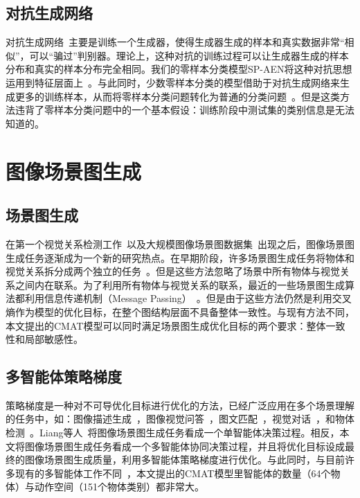 \subsection{对抗生成网络}
对抗生成网络~\cite{goodfellow2014generative}主要是训练一个生成器，使得生成器生成的样本和真实数据非常“相似”，可以“骗过”判别器。理论上，这种对抗的训练过程可以让生成器生成的样本分布和真实的样本分布完全相同。我们的零样本分类模型SP-AEN将这种对抗思想运用到特征层面上~\cite{odena2017conditional,tzeng2017adversarial,makhzani2015adversarial,shrivastava2017learning}。与此同时，少数零样本分类的模型借助于对抗生成网络来生成更多的训练样本，从而将零样本分类问题转化为普通的分类问题~\cite{mishra2018generative}。但是这类方法违背了零样本分类问题中的一个基本假设：训练阶段中测试集的类别信息是无法知道的。


\section{图像场景图生成}

\subsection{场景图生成}
在第一个视觉关系检测工作~\cite{lu2016visual}以及大规模图像场景图数据集~\cite{krishna2017visual}出现之后，图像场景图生成任务逐渐成为一个新的研究热点。在早期阶段，许多场景图生成任务将物体和视觉关系拆分成两个独立的任务~\cite{lu2016visual,zhang2017visual,zhuang2017towards,zhu2018deep,zhang2017relationship}。但是这些方法忽略了场景中所有物体与视觉关系之间内在联系。为了利用所有物体与视觉关系的联系，最近的一些场景图生成算法都利用信息传递机制（Message Passing）~\cite{xu2017scene,dai2017detecting,li2017scene,li2018factorizable,yin2018zoom,jae2018tensorize,yang2018graph,tang2019learning,gu2019scene,qi2019attentive,wang2019exploring}。但是由于这些方法仍然是利用交叉熵作为模型的优化目标，在整个图结构层面不具备整体一致性。与现有方法不同，本文提出的CMAT模型可以同时满足场景图生成优化目标的两个要求：整体一致性和局部敏感性。


\subsection{多智能体策略梯度}

策略梯度是一种对不可导优化目标进行优化的方法，已经广泛应用在多个场景理解的任务中，如：图像描述生成~\cite{ranzato2016sequence,ren2017deep,liu2017improved,rennie2017self,zhang2017actor,liu2018context}，图像视觉问答~\cite{hu2017learning,johnson2017inferring}，图文匹配~\cite{chen2017query,yu2017joint}，视觉对话~\cite{das2017learning}，和物体检测~\cite{caicedo2015active,mathe2016reinforcement,jie2016tree}。Liang等人~\cite{liang2017deep}将图像场景图生成任务看成一个单智能体决策过程。相反，本文将图像场景图生成任务看成一个多智能体协同决策过程，并且将优化目标设成最终的图像场景图生成质量，利用多智能体策略梯度进行优化。与此同时，与目前许多现有的多智能体工作不同~\cite{foerster2016learning,omidshafiei2017deep}，本文提出的CMAT模型里智能体的数量（64个物体）与动作空间（151个物体类别）都非常大。



